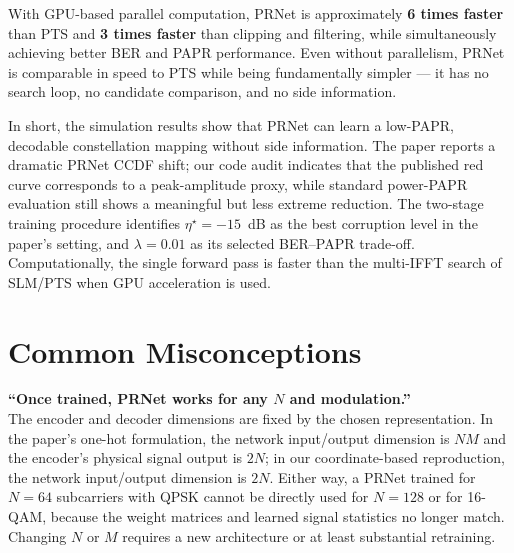 With GPU-based parallel computation, PRNet is approximately \textbf{6 times faster} than PTS and \textbf{3 times faster} than clipping and filtering, while simultaneously achieving better BER and PAPR performance.  Even without parallelism, PRNet is comparable in speed to PTS while being fundamentally simpler --- it has no search loop, no candidate comparison, and no side information.

In short, the simulation results show that PRNet can learn a low-PAPR, decodable constellation mapping without side information.  The paper reports a dramatic PRNet CCDF shift; our code audit indicates that the published red curve corresponds to a peak-amplitude proxy, while standard power-PAPR evaluation still shows a meaningful but less extreme reduction.  The two-stage training procedure identifies $\eta^\star = -15$~dB as the best corruption level in the paper's setting, and $\lambda = 0.01$ as its selected BER--PAPR trade-off.  Computationally, the single forward pass is faster than the multi-IFFT search of SLM/PTS when GPU acceleration is used.


\section{Common Misconceptions}

\begin{misconception}
    \textbf{``Once trained, PRNet works for any $N$ and modulation.''} \\
    The encoder and decoder dimensions are fixed by the chosen representation. In the paper's one-hot formulation, the network input/output dimension is $NM$ and the encoder's physical signal output is $2N$; in our coordinate-based reproduction, the network input/output dimension is $2N$.  Either way, a PRNet trained for $N = 64$ subcarriers with QPSK cannot be directly used for $N = 128$ or for 16-QAM, because the weight matrices and learned signal statistics no longer match.  Changing $N$ or $M$ requires a new architecture or at least substantial retraining.
\end{misconception}

